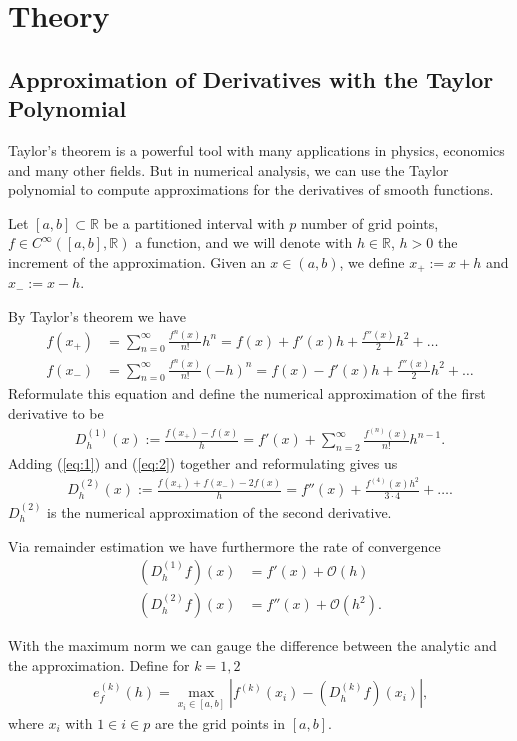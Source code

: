 \section{Theory}
\subsection{Approximation of Derivatives with the Taylor Polynomial}
Taylor's theorem is a powerful tool with many applications in physics, economics and many other fields. But in numerical analysis, we can use the Taylor polynomial to compute approximations for the derivatives of smooth functions.

Let \([a, b] \subset \mathbb{R}\) be a partitioned interval with \(p\) number of grid points, \(f \in C^{\infty}([a, b], \mathbb{R})\) a function, and we will denote with \(h \in \mathbb{R}\), \(h > 0\) the increment of the approximation. Given an \(x \in (a, b)\), we define \(x_{+} := x + h\) and \(x_{-} := x - h\).

By Taylor's theorem \cite{H.Amann} we have
\begin{align}
    f(x_{+}) &= \sum^{\infty}_{n = 0} \frac{f^{n}(x)}{n!} h^n = f(x) + f'(x)h + \frac{f''(x)}{2}h^2 + \dots \label{eq:1}\\
    f(x_{-}) &= \sum^{\infty}_{n = 0} \frac{f^{n}(x)}{n!} (-h)^n = f(x) - f'(x)h + \frac{f''(x)}{2}h^2 + \dots \label{eq:2}
\end{align}
Reformulate this equation and define the numerical approximation of the first derivative to be
\begin{align*}
    D^{(1)}_h (x) := \frac{f(x_{+}) - f(x)}{h} = f'(x) + \sum^{\infty}_{n = 2} \frac{f^{(n)} (x)}{n!}h^{n-1} \text{.}
\end{align*}
Adding (\ref{eq:1}) and (\ref{eq:2}) together and reformulating gives us
\begin{align*}
    D^{(2)}_h (x) := \frac{f(x_{+}) + f(x_{-}) - 2f(x)}{h} = f''(x) + \frac{f^{(4)}(x)h^2}{3 \cdot 4} + \dots \text{.}
\end{align*}
\(D^{(2)}_h\) is the numerical approximation of the second derivative.

Via remainder estimation we have furthermore the rate of convergence
\begin{align*}
    (D^{(1)}_h f) (x) &= f'(x) + \mathcal{O}(h) \\
    (D^{(2)}_h f) (x) &= f''(x) + \mathcal{O}(h^2) \text{.}
\end{align*}

With the maximum norm we can gauge the difference between the analytic and the approximation. Define for \(k = 1, 2\)
\begin{align*}
    e^{(k)}_f (h) = \max_{x_i \in [a, b]} \left| f^{(k)} (x_i) - (D^{(k)}_h f) (x_i)\right| \text{,}
\end{align*}
where \(x_i\) with \(1 \in i \in p\) are the grid points in \([a, b]\).

